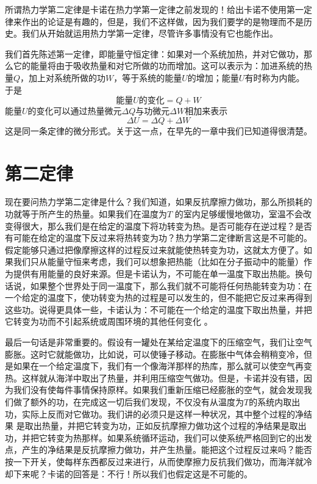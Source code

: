 所谓热力学第二定律是卡诺在热力学第一定律之前发现的！给出卡诺不使用第一定律来作出的论证是有趣的，但是，我们不这样做，因为我们要学的是物理而不是历史。我们从开始就运用热力学第一定律，尽管许多事情没有它也能作出。

我们首先陈述第一定律，即能量守恒定律：如果对一个系统加热，并对它做功，那么它的能量将由于吸收热量和对它所做的功而增加。这可以表示为：加进系统的热量$Q$，加上对系统所做的功$W$，等于系统的能量$U$的增加；能量$U$有时称为内能。于是
\begin{equation}
    \label{Eq:I:44:1}
    \text{能量$U$的变化} = Q+W
\end{equation}
能量$U$的变化可以通过热量微元$\Delta Q$与功微元$\Delta W$相加来表示
\begin{equation}
    \label{Eq:I:44:2}
    \Delta U =\Delta Q +\Delta W
\end{equation}
这是同一条定律的微分形式。关于这一点，在早先的一章中我们已知道得很清楚。

\section{第二定律}

现在要问热力学第二定律是什么？我们知道，如果反抗摩擦力做功，那么所损耗的功就等于所产生的热量。如果我们在温度为$T$ 的室内足够缓慢地做功，室温不会改变得很大，那么我们是在给定的温度下将功转变为热。是否可能存在逆过程？是否有可能在给定的温度下反过来将热转变为功？热力学第二定律断言这是不可能的。假定能够只通过把像摩擦这样的过程反过来就能使热转变为功，这就太方便了。如果我们只从能量守恒来考虑，我们可以想象把热能（比如在分子振动中的能量）作为提供有用能量的良好来源。但是卡诺认为，不可能在单一温度下取出热能。换句话说，如果整个世界处于同一温度下，那么我们就不可能将任何热能转变为功：在一个给定的温度下，使功转变为热的过程是可以发生的，但不能把它反过来再得到这些功。说得更具体一些，卡诺认为：不可能在一个给定的温度下取出热量，并把它转变为功而不引起系统或周围环境的其他任何变化 。

最后一句话是非常重要的。假设有一罐处在某给定温度下的压缩空气，我们让空气膨胀。这时它就能做功，比如说，可以使锤子移动。在膨胀中气体会稍稍变冷，但是如果在一个给定温度下，我们有一个像海洋那样的热库，那么就可以使空气再变热。这样就从海洋中取出了热量，并利用压缩空气做功。但是，卡诺并没有错，因为我们没有使每件事情保持原样。如果我们重新压缩已经膨胀的空气，就会发现我们做了额外的功，在完成这一切后我们发现，不仅没有从温度为$T$的系统内取出功，实际上反而对它做功。我们讲的必须只是这样一种状况，其中整个过程的净结果 是取出热量，并把它转变为功，正如反抗摩擦力做功这个过程的净结果是取出功，并把它转变为热那样。如果系统循环运动，我们可以使系统严格回到它的出发点，产生的净结果是反抗摩擦力做功，并产生热量。能把这个过程反过来吗？能否按一下开关，使每样东西都反过来进行，从而使摩擦力反抗我们做功，而海洋就冷却下来呢？卡诺的回答是：不行！所以我们也假定这是不可能的。

